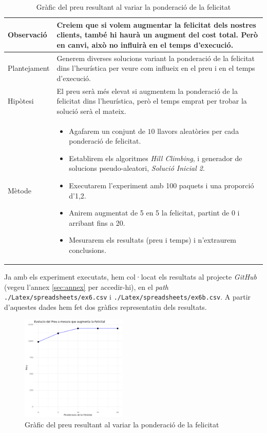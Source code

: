 \documentclass[a4paper]{article}
\begin{document}
\begin{table}[ht]
	\begin{table}[H]
		\centering
		\begin{tabular}{|l|p{10cm}|}
			\hline
			Observació & Creiem que si volem augmentar la felicitat dels nostres clients, també hi haurà un augment del cost total. Però en canvi, això no influirà en el temps d'execució. \\
			\hline
			Plantejament & Generem diverses solucions variant la ponderació de la felicitat dins l'heurística per veure com influeix en el preu i en el temps d'execució. \\
			\hline
			Hipòtesi & El preu serà més elevat si augmentem la ponderació de la felicitat dins l'heurística, però el temps emprat per trobar la solució serà el mateix. \\
			\hline
			Mètode & 
			\begin{itemize}
				\item Agafarem un conjunt de $10$ llavors aleatòries per cada ponderació de felicitat.
				\item Establirem els algoritmes \textit{Hill Climbing}, i generador de solucions pseudo-aleatori, \textit{Solució Inicial 2}.
				\item Executarem l'experiment amb 100 paquets i una proporció d'1,2.
				\item Anirem augmentat de 5 en 5 la felicitat, partint de 0 i arribant fins a 20.
				\item Mesurarem els resultats (preu i temps) i n'extraurem conclusions.
			\end{itemize} \\
			\hline
		\end{tabular}
		\label{tab:exp6_apartats}
	\end{table}
	
	Ja amb els experiment executats, hem col·locat els resultats al projecte \textit{GitHub} (vegeu l'annex \ref{sec:annex} per accedir-hi), en el \textit{path} \texttt{./Latex/spreadsheets/ex6.csv} i \texttt{./Latex/spreadsheets/ex6b.csv}. A partir d'aquestes dades hem fet dos gràfics representatiu dels resultats.
	
	\begin{figure}[H]
		\centering
		\includegraphics[width=0.45\textwidth]{images/exp6_grafic.png}
		\caption{Gràfic del preu resultant al variar la ponderació de la felicitat}
		\label{fig:exp6a_grafic}
	\end{figure}
	

\end{table}
\end{document}
